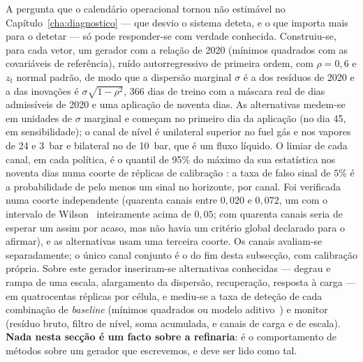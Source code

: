 A pergunta que o calendário operacional tornou não estimável no
Capítulo~\ref{cha:diagnostico} --- que desvio o sistema deteta, e o que
importa mais para o detetar --- só pode responder-se com verdade conhecida.
Construiu-se, para cada vetor, um gerador  com a relação de 2020 (mínimos quadrados com as
covariáveis de referência), ruído autorregressivo de primeira ordem,
com $\rho = 0{,}6$ e $z_t$ normal padrão, de modo que a dispersão marginal
$\sigma$ é a dos resíduos de 2020 e a das inovações é $\sigma\sqrt{1-\rho^2}$,
366 dias de treino com a máscara real de dias admissíveis de 2020 e uma
aplicação de noventa dias. As alternativas medem-se em unidades de $\sigma$
marginal e começam no primeiro dia da aplicação (no dia 45, em
sensibilidade); o canal de nível é unilateral superior no fuel gás e nos
vapores de 24 e 3~bar e bilateral no de 10~bar, que é um fluxo líquido. O
limiar de cada canal, em cada política, é o quantil de 95\% do máximo da
sua estatística nos noventa dias numa coorte de réplicas de calibração
: a
taxa de falso sinal de $5\%$ é a probabilidade de pelo menos um sinal no
horizonte, por canal. Foi verificada numa coorte independente (quarenta
canais entre $0{,}020$ e $0{,}072$, um com o intervalo de
Wilson~\cite{Wilson1927} inteiramente acima de $0{,}05$; com quarenta canais
seria de esperar um assim por acaso, mas não havia um critério global
declarado para o afirmar), e as alternativas usam uma terceira coorte. Os
canais avaliam-se separadamente; o único canal conjunto é o do fim desta
subsecção, com calibração própria. Sobre este gerador inseriram-se
alternativas conhecidas --- degrau e rampa de uma escala, alargamento da
dispersão, recuperação, resposta à carga --- em quatrocentas réplicas por
célula, e mediu-se a taxa de deteção de cada combinação de \emph{baseline}
(mínimos quadrados ou modelo
aditivo~\cite{HastieTibshirani1986,Wood2017}) e
monitor (resíduo bruto, filtro de
nível, soma acumulada, e canais de carga e de
escala). \textbf{Nada nesta
secção é um facto sobre a refinaria}: é o comportamento de métodos sobre um
gerador que escrevemos, e deve ser lido como tal.

